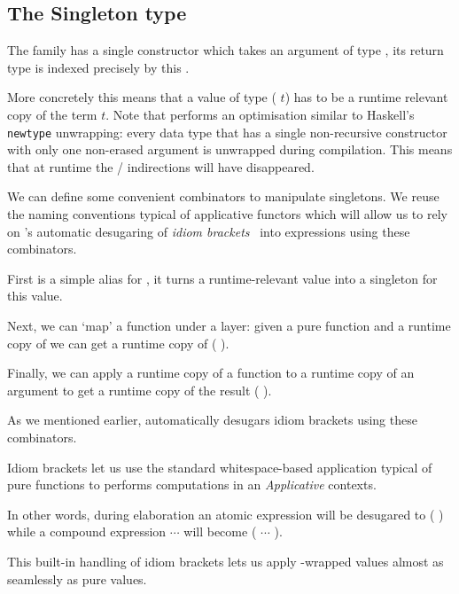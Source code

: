 
\subsection{The Singleton type}\label{sec:datasingleton}

The  family has a single constructor
which takes an argument  of type ,
its return type is indexed precisely by this .


More concretely this means that a value of type
( $t$) has to be a runtime relevant
copy of the term $t$.
%
Note that \idris{} performs an optimisation similar to Haskell's
\texttt{newtype} unwrapping: every data type that has a single
non-recursive constructor with only one non-erased argument
is unwrapped during compilation.
%
This means that at runtime the
 /  indirections
will have disappeared.

We can define some convenient combinators to manipulate
singletons.
%
We reuse the naming conventions typical of applicative
functors which will allow us to rely on \idris{}'s automatic
desugaring of \emph{idiom brackets}~\citep{DBLP:journals/jfp/McbrideP08}
into expressions using these combinators.

First  is a simple alias for ,
it turns a runtime-relevant value  into a singleton for
this value.


Next, we can `map' a function under a  layer: given
a pure function  and a runtime copy of  we
can get a runtime copy of ( ).


Finally, we can apply a runtime copy of a function 
to a runtime copy of an argument 
to get a runtime copy of the result ( ).


As we mentioned earlier, \idris{} automatically desugars idiom brackets
using these combinators.

\begin{remark}
  Idiom brackets let us use the standard whitespace-based application
  typical of pure functions to performs computations in an \emph{Applicative}
  contexts.

  In other words, during elaboration an atomic expression
  \IdrisKeyword{[|}  \IdrisKeyword{|]}
  will be desugared to ( )
  while a compound expression
  \IdrisKeyword{[|}   $\cdots$  \IdrisKeyword{|]}
  will become ( \IdrisFunction{<\$>}  \IdrisFunction{<*>} $\cdots$ \IdrisFunction{<*>} ).
\end{remark}

This built-in handling of idiom brackets lets us apply
-wrapped values almost as seamlessly
as pure values.
